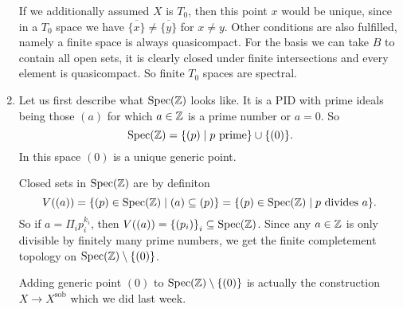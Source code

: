 \begin{exercise}{1}
\begin{enumerate}
{            If we additionally assumed $X$ is $T_0$, then this point $x$ would
            be unique, since in a $T_0$ space we have $\overline{\{x\}} \not=
            \overline{\{y\}}$ for $x \not= y$. Other conditions are also
            fulfilled, namely a finite space is always quasicompact. For the
            basis we can take $B$ to contain all open sets, it is clearly closed
            under finite intersections and every element is quasicompact. So
            finite $T_0$ spaces are spectral.
            }
        \item{
                Let us first describe what $\operatorname{Spec}(\mathbb{Z})$ looks like. It is a PID
                with prime ideals being those $(a)$ for which $a \in \mathbb{Z}$ is a
                prime number or $a = 0$. So
                \begin{equation*}
                    \operatorname{Spec}(\mathbb{Z}) = \{ (p) \mid p\ \text{prime} \} \cup \{ (0) \}.
                \end{equation*}
                In this space $(0)$ is a unique generic point.

                Closed sets in $\operatorname{Spec}(\mathbb{Z})$ are by definiton
                \begin{equation*}
                    V((a)) = \{ (p) \in \operatorname{Spec}(\mathbb{Z}) \mid (a) \subseteq (p) \} = 
                    \{ (p) \in \operatorname{Spec}(\mathbb{Z}) \mid p\ \text{divides}\ a \}.
                \end{equation*}
                So if $a = \Pi_{i} p^{k_i}_i$, then $V((a)) = {\{ (p_i) \}}_i
                \subseteq \operatorname{Spec}(\mathbb{Z})$. Since any $a \in \mathbb{Z}$ is only divisible by
                finitely many prime numbers, we get the finite completement
                topology on $\operatorname{Spec}(\mathbb{Z}) \setminus \{(0)\}$.

                Adding generic point $(0)$ to $\operatorname{Spec}(\mathbb{Z}) \setminus \{(0)\}$ is
                actually the construction $X \rightarrow X^{\text{sob}}$ which
                we did last week.



}
\end{enumerate}
\end{exercise}
